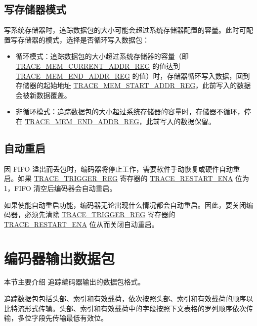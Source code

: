\documentclass[main\_\_CN.tex]{subfiles}
\begin{document}
\subsection{写存储器模式}

写系统存储器时，追踪数据包的大小可能会超过系统存储器配置的容量。此时可配置写存储器的模式，选择是否循环写入数据包：

\begin{itemize}
    \item 循环模式：追踪数据包的大小超过系统存储器的容量（即 \hyperref[regdesc:TRACEMEMCURRENTADDRREG]{TRACE\_MEM\_CURRENT\_ADDR\_REG} 的值达到 \hyperref[regdesc:TRACEMEMENDADDRREG]{TRACE\_MEM\_END\_ADDR\_REG} 的值）时，存储器循环写入数据，回到存储器的起始地址 \hyperref[regdesc:TRACEMEMSTARTADDRREG]{TRACE\_MEM\_START\_ADDR\_REG}，此前写入的数据会被新数据覆盖。
    \item 非循环模式：追踪数据包的大小超过系统存储器的容量时，存储器不循环，停在 \hyperref[regdesc:TRACEMEMENDADDRREG]{TRACE\_MEM\_END\_ADDR\_REG}，此前写入的数据保留。
\end{itemize}

\subsection{自动重启}

因 FIFO 溢出而丢包时，编码器将停止工作，需要软件手动恢复或硬件自动重启。如果 \hyperref[regdesc:TRACETRIGGERREG]{TRACE\_TRIGGER\_REG} 寄存器的 \hyperref[fielddesc:TRACERESTARTENA]{TRACE\_RESTART\_ENA} 位为 1，FIFO 清空后编码器会自动重启。

如果使能自动重启功能，编码器无论出现什么情况都会自动重启。因此，要关闭编码器，必须先清除 \hyperref[regdesc:TRACETRIGGERREG]{TRACE\_TRIGGER\_REG} 寄存器的 \hyperref[fielddesc:TRACERESTARTENA]{TRACE\_RESTART\_ENA} 位从而关闭自动重启。


\section{编码器输出数据包}
\label{sec:riscvtracenc-packetes}

本节主要介绍 \chipname{} 追踪编码器输出的数据包格式。

追踪数据包包括头部、索引和有效载荷，依次按照头部、索引和有效载荷的顺序以比特流形式传输。头部、索引和有效载荷中的字段按照下文表格的罗列顺序依次传输，多位字段先传输最低有效位。
\end{document}
